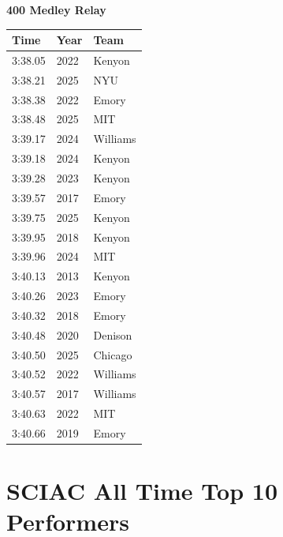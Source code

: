 \noindent\begin{minipage}[t]{0.98\textwidth}
\centering
\textbf{\textcolor{teamprimary}{400 Medley Relay}}\par
\vspace{0.5em}
\centering
\small
\renewcommand{\arraystretch}{1.0}
\setlength{\tabcolsep}{4pt}
\begin{tabular}{@{}p{4.5cm}p{2.5cm}p{4.5cm}@{}}
\toprule
\textbf{Time} & \textbf{Year} & \textbf{Team} \\
\midrule
3:38.05 & 2022 & Kenyon \\
3:38.21 & 2025 & NYU \\
3:38.38 & 2022 & Emory \\
3:38.48 & 2025 & MIT \\
3:39.17 & 2024 & Williams \\
3:39.18 & 2024 & Kenyon \\
3:39.28 & 2023 & Kenyon \\
3:39.57 & 2017 & Emory \\
3:39.75 & 2025 & Kenyon \\
3:39.95 & 2018 & Kenyon \\
3:39.96 & 2024 & MIT \\
3:40.13 & 2013 & Kenyon \\
3:40.26 & 2023 & Emory \\
3:40.32 & 2018 & Emory \\
3:40.48 & 2020 & Denison \\
3:40.50 & 2025 & Chicago \\
3:40.52 & 2022 & Williams \\
3:40.57 & 2017 & Williams \\
3:40.63 & 2022 & MIT \\
3:40.66 & 2019 & Emory \\
\bottomrule
\end{tabular}
\end{minipage}
\vspace{-0.5em}
\clearpage
\section{SCIAC All Time Top 10 Performers}
\clearpage
